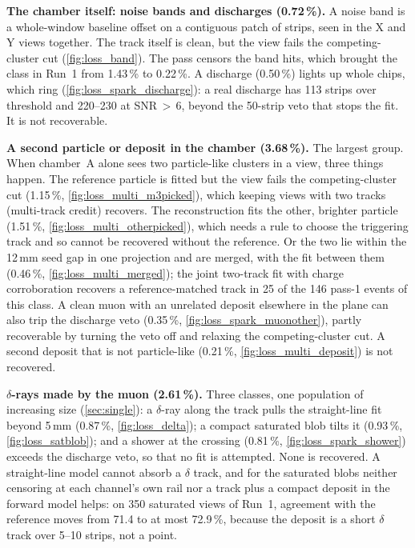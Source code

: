 \textbf{The chamber itself: noise bands and discharges (0.72\,\%).} A noise band is a whole-window baseline offset on a
contiguous patch of strips, seen in the X and Y views together. The track itself is clean, but the view fails the
competing-cluster cut (\cref{fig:loss_band}). The pass censors the band hits, which brought the class in Run~1 from
1.43\,\% to 0.22\,\%. A discharge (0.50\,\%) lights up whole chips, which ring (\cref{fig:loss_spark_discharge}): a
real discharge has 113 strips over threshold and 220--230 at SNR\,$>$\,6, beyond the 50-strip veto that stops the
fit. It is not recoverable.

\textbf{A second particle or deposit in the chamber (3.68\,\%).} The largest group. When chamber~A alone sees two particle-like clusters in a view, three things happen. The reference
particle is fitted but the view fails the competing-cluster cut (1.15\,\%, \cref{fig:loss_multi_m3picked}), which
keeping views with two tracks (multi-track credit) recovers. The reconstruction fits the other, brighter particle
(1.51\,\%, \cref{fig:loss_multi_otherpicked}), which needs a rule to choose the triggering track and so cannot be
recovered without the reference. Or the two lie within the 12\,mm seed gap in one projection and are merged, with the
fit between them (0.46\,\%, \cref{fig:loss_multi_merged}); the joint two-track fit with charge corroboration recovers
a reference-matched track in 25 of the 146 pass-1 events of this class. A clean muon with an unrelated deposit
elsewhere in the plane can also trip the discharge veto (0.35\,\%, \cref{fig:loss_spark_muonother}), partly
recoverable by turning the veto off and relaxing the competing-cluster cut. A second deposit that is not
particle-like (0.21\,\%, \cref{fig:loss_multi_deposit}) is not recovered.

\textbf{$\delta$-rays made by the muon (2.61\,\%).} Three classes, one population of increasing size
(\cref{sec:single}): a $\delta$-ray along the track pulls the straight-line fit beyond 5\,mm (0.87\,\%,
\cref{fig:loss_delta}); a compact saturated blob tilts it (0.93\,\%, \cref{fig:loss_satblob}); and a shower at the
crossing (0.81\,\%, \cref{fig:loss_spark_shower}) exceeds the discharge veto, so that no fit is attempted. None is
recovered. A straight-line model cannot absorb a $\delta$ track, and for the saturated blobs neither censoring at
each channel's own rail nor a track plus a compact deposit in the forward model helps: on 350 saturated views of
Run~1, agreement with the reference moves from 71.4 to at most 72.9\,\%, because the deposit is a short $\delta$
track over 5--10 strips, not a point.

